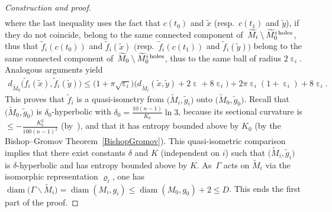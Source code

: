 \documentclass[pdftex]{sigma}
\numberwithin{equation}{section}
\newcommand{\diam}{\operatorname{diam}}
\newcommand{\e}{\operatorname{\varepsilon}}
\begin{document}
\begin{proof}[Construction and proof]
\begin{gather*}
\end{gather*}
where the last inequality uses the fact that $c(t_0)$ and $\tilde x$ (resp.\ $c(t_1)$ and $\tilde y$), if they do not coincide, belong to the same
connected
component of~$ \widetilde M_i \setminus \widetilde M_0^{i {\rm \, holes}}$, thus that $\tilde f_i (c(t_0))$ and $\tilde f_i (\tilde x)$ $\big($resp.\ $\tilde f_i (c(t_1))$
and $\tilde f_i (\tilde y)\big)$ belong to the same connected component of~$ \widetilde M_0 \setminus \widetilde M_0^{i {\rm \, holes}}$, thus to the same ball
of radius $2 \e_i$. Analogous arguments yield
\begin{gather*}
d_{\widetilde M_0}\big(\tilde f_i(\tilde x),\tilde f_i (\tilde y)\big) \le \big(1+ \pi\sqrt{\e_i}\big) \big(d_{\widetilde M_i } (\tilde x,\tilde y) + 2 \e + 8 \e_i \big) + 2 \pi \e_i (1 + \e_i) + 8 \e_i.
\end{gather*}
This proves that $\tilde f_i $ is a quasi-isometry from $\big(\widetilde M_i, \tilde g_i\big)$ onto $\big(\widetilde M_0, \tilde g_0\big)$. Recall that $\big(\widetilde M_0, \tilde g_0\big)$ is
$\delta_0$-hyperbolic with $\delta_0 = \frac{10 (n-1)}{K_0} \ln 3 $, because its sectional curvature is $\le - \frac{K_0^2}{100 (n-1)^2}$ (by~\cite[Proposition~1.4.3, p.~12]{CDP}), and that it has entropy bounded
above by $K_0$ (by the Bishop--Gromov Theorem~\ref{BishopGromov}). This quasi-isometric comparison implies that
there exist constants $\delta$ and $K$ (independent on $i$) such that $\big(\widetilde M_i, \tilde g_i\big)$ is $\delta$-hyperbolic and has entropy bounded
above by $K$. As~$\Gamma$ acts on $\widetilde M_i$ via the isomorphic representation $\varrho_i$, one has
$\diam \big(\Gamma \backslash \widetilde M_i\big) = \diam (M_i,g_i) \le \diam (M_0, g_0) + 2 \le D $. This ends the first part of the proof.

\medskip


\end{proof}
\end{document}
